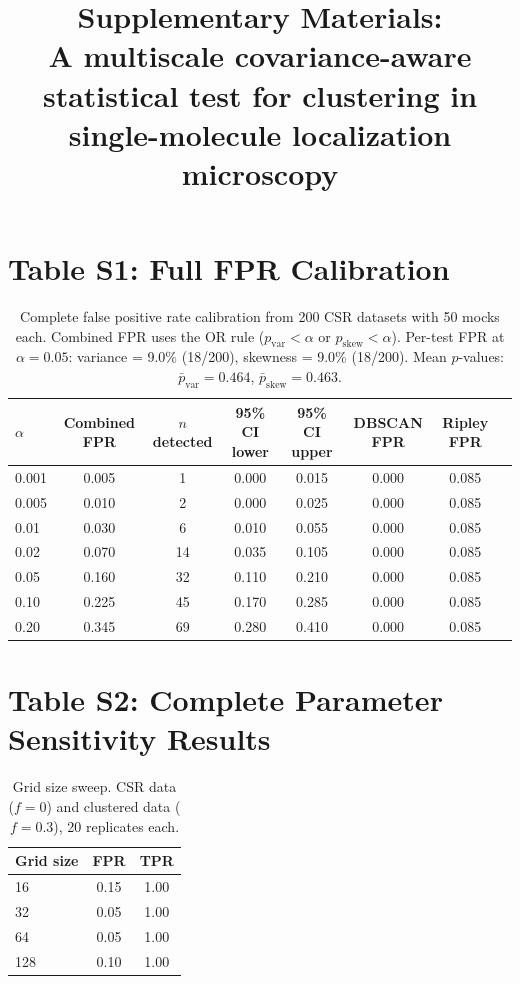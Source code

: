 \documentclass[11pt]{article}
\title{Supplementary Materials:\\
  A multiscale covariance-aware statistical test for clustering in
  single-molecule localization microscopy}
\author{}
\date{}
\begin{document}
\maketitle

\section*{Table S1: Full FPR Calibration}

\begin{table}[ht]
\centering
\caption{Complete false positive rate calibration from 200 CSR datasets
  with 50 mocks each. Combined FPR uses the OR rule
  ($p_\mathrm{var} < \alpha$ or $p_\mathrm{skew} < \alpha$). Per-test
  FPR at $\alpha = 0.05$: variance = 9.0\% (18/200), skewness = 9.0\%
  (18/200). Mean $p$-values: $\bar{p}_\mathrm{var} = 0.464$,
  $\bar{p}_\mathrm{skew} = 0.463$.}
\label{tab:s1_fpr}
\begin{tabular}{lccccccc}
\toprule
$\alpha$ & Combined FPR & $n$ detected & 95\% CI lower & 95\% CI upper
  & DBSCAN FPR & Ripley FPR \\
\midrule
0.001 & 0.005 & 1   & 0.000 & 0.015 & 0.000 & 0.085 \\
0.005 & 0.010 & 2   & 0.000 & 0.025 & 0.000 & 0.085 \\
0.01  & 0.030 & 6   & 0.010 & 0.055 & 0.000 & 0.085 \\
0.02  & 0.070 & 14  & 0.035 & 0.105 & 0.000 & 0.085 \\
0.05  & 0.160 & 32  & 0.110 & 0.210 & 0.000 & 0.085 \\
0.10  & 0.225 & 45  & 0.170 & 0.285 & 0.000 & 0.085 \\
0.20  & 0.345 & 69  & 0.280 & 0.410 & 0.000 & 0.085 \\
\bottomrule
\end{tabular}
\end{table}

\section*{Table S2: Complete Parameter Sensitivity Results}

\begin{table}[ht]
\centering
\caption{Grid size sweep. CSR data ($f = 0$) and clustered data
  ($f = 0.3$), 20 replicates each.}
\label{tab:s2_grid}
\begin{tabular}{lcc}
\toprule
Grid size & FPR & TPR \\
\midrule
16  & 0.15 & 1.00 \\
32  & 0.05 & 1.00 \\
64  & 0.05 & 1.00 \\
128 & 0.10 & 1.00 \\
\bottomrule
\end{tabular}
\end{table}
\end{document}
